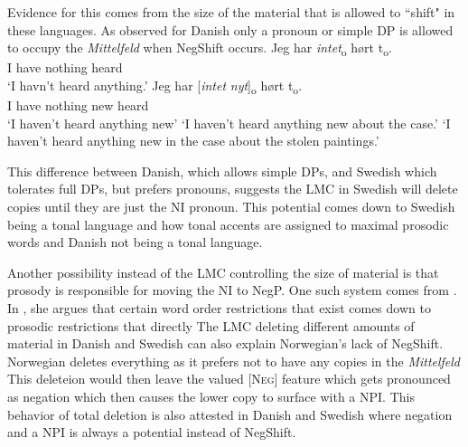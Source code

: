 \documentclass[12pt, letterpaper]{article}
\begin{document}
Evidence for this comes from the size of the material that is allowed to ``shift" in these languages. As observed for Danish only a pronoun or simple DP is allowed to occupy the \emph{Mittelfeld} when NegShift occurs. 
\ea 
	\ea 
		\gll Jeg har \textit{intet}\textsubscript{o} hørt t\textsubscript{o}.\\
		I have nothing heard\\
		\glt  `I havn't heard anything.'
	\ex 
		\gll Jeg har [\textit{intet} \textit{nyt}]\textsubscript{o} hørt t\textsubscript{o}.\\
		I have nothing new heard\\
		\glt `I haven't heard anything new'
		\glt `I haven't heard anything new about the case.'
		\glt `I haven't heard anything new in the case about the stolen paintings.'
	\z  	
\z 

This difference between Danish, which allows simple DPs, and Swedish which tolerates full DPs, but prefers pronouns, suggests the LMC in Swedish will delete copies until they are just the NI pronoun. This potential comes down to Swedish being a tonal language and how tonal accents are assigned to maximal prosodic words \citep{myrbergProsodicWordSwedish2013,myrbergProsodicHierarchySwedish2015,riadPhonologySwedish2014} and Danish not being a tonal language.

Another possibility instead of the LMC controlling the size of material is that prosody is responsible for moving the NI to NegP. One such system comes from \citet{zubizarretaProsodyFocusWord1998}. In \citet{zubizarretaProsodyFocusWord1998}, she argues that certain word order restrictions that exist comes down to prosodic restrictions that directly 
\ea The LMC deleting different amounts of material in Danish and Swedish can also explain Norwegian's lack of NegShift. 
	\ea Norwegian deletes everything as it prefers not to have any copies in the \emph{Mittelfeld}
	\ex This deleteion would then leave the valued [\textsc{Neg}] feature which gets pronounced as negation which then causes the lower copy to surface with a NPI.  
	\ex This behavior of total deletion is also attested in Danish and Swedish where negation and a NPI is always a potential instead of NegShift.
	\z  
\end{document}
